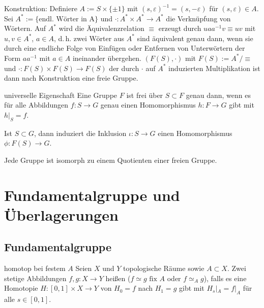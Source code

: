 \begin{Bem}
    Konstruktion:
    Definiere $A := S \times \{\pm 1\}$ mit
    $(s, \varepsilon)^{-1} = (s, -\varepsilon)$ für $(s, \varepsilon) \in A$.
    Sei $A^\ast := \{\text{endl. Wörter in A}\}$ und
    $\cdot\colon A^\ast \times A^\ast \rightarrow A^\ast$ die Verknüpfung
    von Wörtern.
    Auf $A^\ast$ wird die Äquivalenzrelation $\equiv$ erzeugt durch
    $uaa^{-1}v \equiv uv$ mit $u, v \in A^\ast$, $a \in A$, d.\,h. zwei
    Wörter aus $A^\ast$ sind äquivalent genau dann, wenn sie durch eine
    endliche Folge von Einfügen oder Entfernen von Unterwörtern der Form
    $aa^{-1}$ mit $a \in A$ ineinander übergehen.
    $(F(S), \cdot)$ mit $F(S) := A^\ast/\equiv$ und
    $\cdot\colon F(S) \times F(S) \rightarrow F(S)$
    der durch $\cdot$ auf $A^\ast$ induzierten Multiplikation ist dann
    nach Konstruktion eine freie Gruppe.
\end{Bem}

\linie

\begin{Satz}{universelle Eigenschaft}
    Eine Gruppe $F$ ist frei über $S \subset F$ genau dann, wenn es für alle
    Abbildungen $f\colon S \rightarrow G$ genau einen Homomorphismus
    $h\colon F \rightarrow G$ gibt mit $h|_S = f$.
\end{Satz}

\begin{Kor}
    Ist $S \subset G$, dann induziert die Inklusion
    $\iota\colon S \rightarrow G$ einen Homomorphismus \\
    $\phi\colon F(S) \rightarrow G$.
\end{Kor}

\begin{Kor}
    Jede Gruppe ist isomorph zu einem Quotienten einer freien Gruppe.
\end{Kor}

\pagebreak

\section{%
    Fundamentalgruppe und Überlagerungen%
}

\subsection{%
    Fundamentalgruppe%
}

\begin{Def}{homotop bei festem $A$}
    Seien $X$ und $Y$ topologische Räume sowie $A \subset X$.
    Zwei stetige Abbildungen $f, g\colon X \rightarrow Y$ heißen
     ($f \simeq g \text{ fix } A$ oder
    $f \simeq_A g$), falls es eine Homotopie
    $H\colon [0, 1] \times X \rightarrow Y$ von $H_0 = f$ nach $H_1 = g$ gibt
    mit $H_s|_A = f|_A$ für alle $s \in [0, 1]$.
\end{Def}

